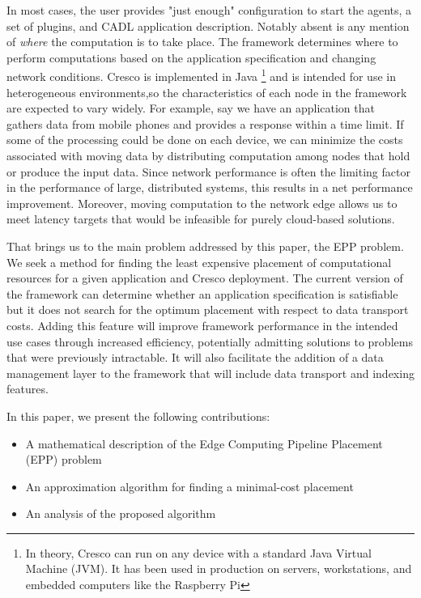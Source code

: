 \documentclass{acmart}
\begin{document}
    In most cases, the user provides "just enough" configuration to start the agents, a set of plugins, and CADL application description. Notably absent is any mention of \textit{where} the computation is to take place. The framework determines where to perform computations based on the application specification and changing network conditions. Cresco is implemented in Java \footnote{In theory, Cresco can run on any device with a standard Java Virtual Machine (JVM). It has been used in production on servers, workstations, and embedded computers like the Raspberry Pi}
    and is intended for use in heterogeneous environments,so the characteristics of each node in the framework are expected to vary widely. For example, say we have an application that gathers data from mobile phones and provides a response within a time limit. If some of the processing could be done on each device, we can minimize the costs associated with moving data by distributing computation among nodes that hold or produce the input data. Since network performance is often the limiting factor in the performance of large, distributed systems, this results in a net performance improvement. Moreover, moving computation to the network edge allows us to meet latency targets that would be infeasible for purely cloud-based solutions.
    
    That brings us to the main problem addressed by this paper, the EPP problem.  We seek a method for finding the least expensive placement of computational resources for a given application and Cresco deployment. The current version of the framework can determine whether an application specification is satisfiable but it does not search for the optimum placement with respect to data transport costs. Adding this feature will improve framework performance in the intended use cases through increased efficiency, potentially admitting solutions to problems that were previously intractable. It will also facilitate the addition of a data management layer to the framework that will include data transport and indexing features.
    
    In this paper, we present the following contributions:
    \begin{itemize}
    	\item A mathematical description of the Edge Computing Pipeline Placement (EPP) problem
    	\item An approximation algorithm for finding a minimal-cost placement
 	    \item An analysis of the proposed algorithm
    \end{itemize}
    
\end{document}
